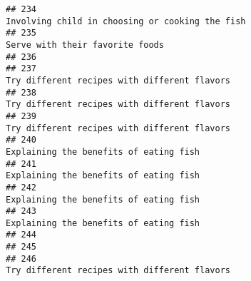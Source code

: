 \documentclass[
]{article}
\begin{document}
\begin{verbatim}
## 234                                                                                                                                                              Involving child in choosing or cooking the fish
## 235                                                                                                                                                                              Serve with their favorite foods
## 236                                                                                                                                                                                                             
## 237                                                                                                                                                                 Try different recipes with different flavors
## 238                                                                                                                                                                 Try different recipes with different flavors
## 239                                                                                                                                                                 Try different recipes with different flavors
## 240                                                                                                                                                                       Explaining the benefits of eating fish
## 241                                                                                                                                                                       Explaining the benefits of eating fish
## 242                                                                                                                                                                       Explaining the benefits of eating fish
## 243                                                                                                                                                                       Explaining the benefits of eating fish
## 244                                                                                                                                                                                                             
## 245                                                                                                                                                                                                             
## 246                                                                                                                                                                 Try different recipes with different flavors

\end{verbatim}
\end{document}
